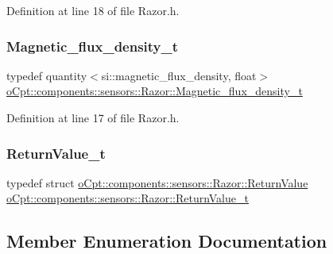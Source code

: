 Definition at line 18 of file Razor.\+h.

\hypertarget{classo_cpt_1_1components_1_1sensors_1_1_razor_ae8fa7bff60dd03d8603e7c7d757ae061}{}\label{classo_cpt_1_1components_1_1sensors_1_1_razor_ae8fa7bff60dd03d8603e7c7d757ae061} 
\subsubsection{\texorpdfstring{Magnetic\+\_\+flux\+\_\+density\+\_\+t}{Magnetic\_flux\_density\_t}}
{\footnotesize\ttfamily typedef quantity$<$si\+::magnetic\+\_\+flux\+\_\+density, float$>$ \hyperlink{classo_cpt_1_1components_1_1sensors_1_1_razor_ae8fa7bff60dd03d8603e7c7d757ae061}{o\+Cpt\+::components\+::sensors\+::\+Razor\+::\+Magnetic\+\_\+flux\+\_\+density\+\_\+t}}



Definition at line 17 of file Razor.\+h.

\hypertarget{classo_cpt_1_1components_1_1sensors_1_1_razor_aab55c5b1a96ce97421e4696599549954}{}\label{classo_cpt_1_1components_1_1sensors_1_1_razor_aab55c5b1a96ce97421e4696599549954} 
\subsubsection{\texorpdfstring{Return\+Value\+\_\+t}{ReturnValue\_t}}
{\footnotesize\ttfamily typedef struct \hyperlink{structo_cpt_1_1components_1_1sensors_1_1_razor_1_1_return_value}{o\+Cpt\+::components\+::sensors\+::\+Razor\+::\+Return\+Value}  \hyperlink{classo_cpt_1_1components_1_1sensors_1_1_razor_aab55c5b1a96ce97421e4696599549954}{o\+Cpt\+::components\+::sensors\+::\+Razor\+::\+Return\+Value\+\_\+t}}



\subsection{Member Enumeration Documentation}
\hypertarget{classo_cpt_1_1components_1_1sensors_1_1_razor_afed258e485aaaf9193a57d649ccb159b}{}\label{classo_cpt_1_1components_1_1sensors_1_1_razor_afed258e485aaaf9193a57d649ccb159b} 
